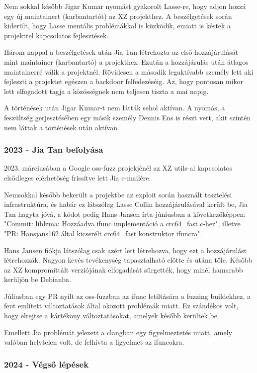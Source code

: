 \documentclass[11pt]{article}
\begin{document}
Nem sokkal később Jigar Kumar nyomást gyakorolt Lasse-re, hogy adjon hozzá egy új maintainert (karbantartót) az XZ projekthez. 
A beszélgetések során kiderült, hogy Lasse mentális problémákkal is küzködik, emiatt is késtek a projekttel kapcsolatos fejlesztések.

Három nappal a beszélgetések után Jia Tan létrehozta az első hozzájárulását mint maintainer (karbantartó) a projekthez. Ezután a hozzájárulás után átlagos maintainerré válik a projektnél. Rövidesen a második legaktívabb személy lett aki fejleszti a projektet egészen a backdoor felfedezéséig.
Az, hogy pontosan mikor lett elfogadott tagja a közösségnek nem teljesen tiszta a mai napig.

A történések után Jigar Kumar-t nem látták sehol aktívan. A nyomás, a feszültség gerjesztésében egy másik személy Dennis Ens is részt vett, akit szintén nem láttak a történések után aktívan.

\subsubsection{2023 - Jia Tan befolyása}

2023. márciusában a Google oss-fuzz projekjénél az XZ utils-al kapcsolatos elsődleges elérhetőség frissítve lett Jia e-mailére.

Nemsokkal később bekerült a projektbe az exploit során használt tesztelési infrastruktúra, és habár ez látszólag Lasse Collin hozzájárulásával került be, Jia Tan hagyta jóvá, a kódot pedig Hans Jansen írta júniusban a következőképpen: "Commit: liblzma: Hozzáadva ifunc implementáció a crc64\_fast.c-hez",  illetve "PR: Hansjans162 által kicserélt crc64\_fast konstruktor ifuncra".

Hans Jansen fiókja látszólag csak azért lett létrehozva, hogy ezt a hozzájárulást létrehozzák. Nagyon kevés tevékenység tapasztalható előtte és utána tőle. 
Később az XZ kompromittált verziójának elfogadását sürgették, hogy minél hamarabb kerüljön be Debianba.

Júliusban egy PR nyílt az oss-fuzzban az ifunc letiltására a fuzzing buildekhez, a fent említett változtatások által okozott problémák miatt. 
Ez szándékos volt, hogy elrejtse a kártékony változtatásokat, amelyek később kerültek be. 

Emellett Jia problémát jelezett a clangban egy figyelmeztetés miatt, amely valóban helytelen volt, de felhívta a figyelmet az ifuncokra.

\subsubsection{2024 - Végső lépések}
\end{document}
